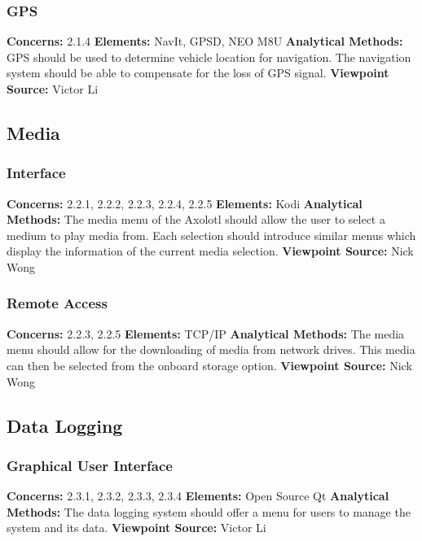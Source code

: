 \documentclass[onecolumn, draftclsnofoot,10pt, compsoc]{IEEEtran}
\begin{document}
\subsubsection{GPS}
\textbf{Concerns:} 2.1.4 \newline
\textbf{Elements:} NavIt, GPSD, NEO M8U \newline
\textbf{Analytical Methods:} GPS should be used to determine vehicle location for navigation. The navigation system should be able to compensate for the loss of GPS signal. \newline
\textbf{Viewpoint Source:} Victor Li

\subsection{Media}
\subsubsection{Interface}
\textbf{Concerns:} 2.2.1, 2.2.2, 2.2.3, 2.2.4, 2.2.5 \newline
\textbf{Elements:} Kodi \newline
\textbf{Analytical Methods:} The media menu of the Axolotl should allow the user to select a medium to play media from. Each selection should introduce similar menus which display the information of the current media selection.  \newline
\textbf{Viewpoint Source:} Nick Wong

\subsubsection{Remote Access}
\textbf{Concerns:} 2.2.3, 2.2.5 \newline
\textbf{Elements:} TCP/IP \newline
\textbf{Analytical Methods:} The media menu should allow for the downloading of media from network drives. This media can then be selected from the onboard storage option.  \newline
\textbf{Viewpoint Source:} Nick Wong

\subsection{Data Logging}
\subsubsection{Graphical User Interface}
\textbf{Concerns:} 2.3.1, 2.3.2, 2.3.3, 2.3.4 \newline
\textbf{Elements:} Open Source Qt \newline
\textbf{Analytical Methods:} The data logging system should offer a menu for users to manage the system and its data. \newline
\textbf{Viewpoint Source:} Victor Li
\end{document}
